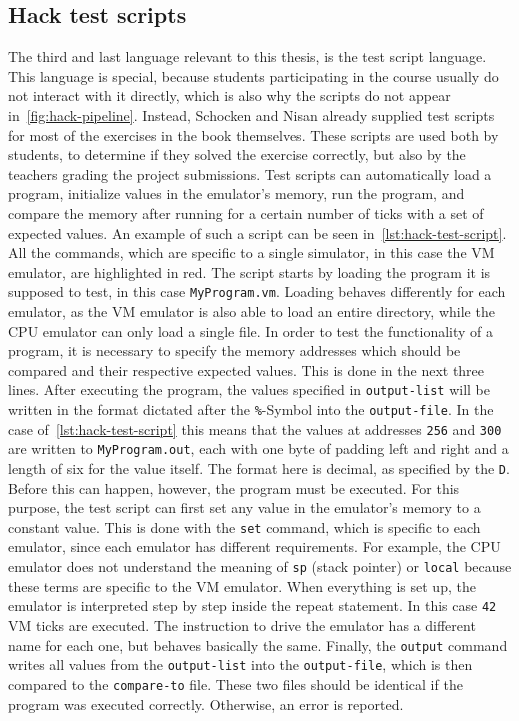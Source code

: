 \subsection{Hack test scripts} \label{test-scripts}
The third and last language relevant to this thesis, is the test script language.
This language is special, because students participating in the course usually do not interact with it directly, which is also why the scripts do not appear in~\cref{fig:hack-pipeline}.
Instead, Schocken and Nisan already supplied test scripts for most of the exercises in the book themselves.
These scripts are used both by students, to determine if they solved the exercise correctly, but also by the teachers grading the project submissions.
Test scripts can automatically load a program, initialize values in the emulator's memory, run the program, and compare the memory after running for a certain number of ticks with a set of expected values.
An example of such a script can be seen in~\cref{lst:hack-test-script}.
All the commands, which are specific to a single simulator, in this case the VM emulator, are highlighted in red.
The script starts by loading the program it is supposed to test, in this case \verb+MyProgram.vm+.
Loading behaves differently for each emulator, as the VM emulator is also able to load an entire directory, while the CPU emulator can only load a single file.
In order to test the functionality of a program, it is necessary to specify the memory addresses which should be compared and their respective expected values.
This is done in the next three lines.
After executing the program, the values specified in \verb+output-list+ will be written in the format dictated after the \verb+%+-Symbol into the \verb+output-file+.
In the case of~\cref{lst:hack-test-script} this means that the values at addresses \verb+256+ and \verb+300+ are written to \verb+MyProgram.out+, each with one byte of padding left and right and a length of six for the value itself.
The format here is decimal, as specified by the \verb+D+.
Before this can happen, however, the program must be executed.
For this purpose, the test script can first set any value in the emulator's memory to a constant value.
This is done with the \verb+set+ command, which is specific to each emulator, since each emulator has different requirements.
For example, the CPU emulator does not understand the meaning of \verb+sp+ (stack pointer) or \verb+local+ because these terms are specific to the VM emulator.
When everything is set up, the emulator is interpreted step by step inside the repeat statement.
In this case \verb+42+ VM ticks are executed.
The instruction to drive the emulator has a different name for each one, but behaves basically the same.
Finally, the \verb+output+ command writes all values from the \verb+output-list+ into the \verb+output-file+, which is then compared to the \verb+compare-to+ file.
These two files should be identical if the program was executed correctly.
Otherwise, an error is reported.

